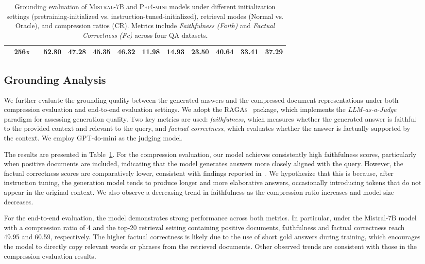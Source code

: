 \documentclass{applemlr}
\numberwithin{equation}{section}
\begin{document}
\begin{table}[H]
\begin{tabular}{c|c|c|cc|cc|cc|cc|cc}
   & 256x &  & 52.80 & 47.28 & 45.35 & 46.32 & 11.98 & 14.93 & 23.50 & 40.64 & 33.41 & 37.29 \\
\hline
\end{tabular}
\caption{Grounding evaluation of \textsc{Mistral-7B} and \textsc{Phi4-mini} models 
under different initialization settings (pretraining-initialized vs. instruction-tuned-initialized), 
retrieval modes (Normal vs. Oracle), and compression ratios (CR). 
Metrics include \textit{Faithfulness (Faith)} and \textit{Factual Correctness (Fc)} across four QA datasets.
}
\label{grounding_performance}
\end{table}
\subsection{Grounding Analysis}

We further evaluate the grounding quality between the generated answers and the compressed document representations 
under both compression evaluation and end-to-end evaluation settings. 
We adopt the \textsc{RAGAs}~\citep{es2025ragasautomatedevaluationretrieval} package, which implements the \textit{LLM-as-a-Judge} paradigm for assessing generation quality. 
Two key metrics are used: \textit{faithfulness}, which measures whether the generated answer is faithful to the provided context 
and relevant to the query, and \textit{factual correctness}, which evaluates whether the answer is factually supported by the context. 
We employ GPT-4o-mini as the judging model.

The results are presented in Table~\ref{grounding_performance}. 
For the compression evaluation, our model achieves consistently high faithfulness scores, particularly when positive documents are included, 
indicating that the model generates answers more closely aligned with the query. 
However, the factual correctness scores are comparatively lower, consistent with findings reported in~\citet{improving_information}. 
We hypothesize that this is because, after instruction tuning, the generation model tends to produce longer and more elaborative answers, 
occasionally introducing tokens that do not appear in the original context. 
We also observe a decreasing trend in faithfulness as the compression ratio increases and model size decreases. 

For the end-to-end evaluation, the model demonstrates strong performance across both metrics. 
In particular, under the Mistral-7B model with a compression ratio of 4 and the top-20 retrieval setting containing positive documents, 
faithfulness and factual correctness reach 49.95 and 60.59, respectively. 
The higher factual correctness is likely due to the use of short gold answers during training, 
which encourages the model to directly copy relevant words or phrases from the retrieved documents. 
Other observed trends are consistent with those in the compression evaluation results.
\end{document}
